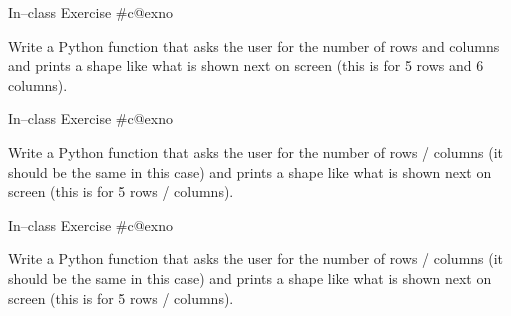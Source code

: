 \documentclass[aspectratio=169, 12pt, xcolor=table]{beamer}
\makeatletter
\newcommand{\arabicthree}[1]{\expandafter\@arabicthree\csname c@#1\endcsname}
\newcommand{\@arabicthree}[1]{\ifnum #1<100 0\fi\ifnum #1<10 0\fi\number#1}
\newcounter{exno}
\newcommand{\exno}{\stepcounter{exno}In--class Exercise \#\arabicthree{exno}}
\makeatother
\begin{document}
	\begin{frame}{\exno}
		\begin{minipage}{0.5\textwidth}
			Write a Python function that asks the user for the number of rows and columns and prints a shape like what is shown next on screen (this is for 5 rows and 6 columns).
		\end{minipage}\hfill
		\begin{minipage}{0.45\textwidth}
			\centering
		\end{minipage}
	\end{frame}
	
	\begin{frame}{\exno}
		\begin{minipage}{0.5\textwidth}
			Write a Python function that asks the user for the number of rows / columns (it should be the same in this case) and prints a shape like what is shown next on screen (this is for 5 rows / columns).
		\end{minipage}\hfill
		\begin{minipage}{0.45\textwidth}
			\centering
		\end{minipage}
	\end{frame}
	
	\begin{frame}{\exno}
		\begin{minipage}{0.5\textwidth}
			Write a Python function that asks the user for the number of rows / columns (it should be the same in this case) and prints a shape like what is shown next on screen (this is for 5 rows / columns).
		\end{minipage}\hfill
		\begin{minipage}{0.45\textwidth}
			\centering
		\end{minipage}
	\end{frame}
	
\end{document}
